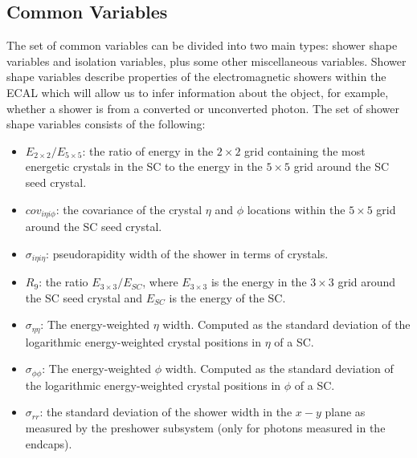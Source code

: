 \subsection{Common Variables}
The set of common variables can be divided into two main types: shower shape variables and isolation variables, plus some other miscellaneous variables. 
Shower shape variables describe properties of the electromagnetic showers within the ECAL which will allow us to infer information about the object, for example, whether a shower is from a converted or unconverted photon.
The set of shower shape variables consists of the following:
\begin{itemize}[noitemsep]
    \item $E_{2\times{}2}/E_{5\times{}5}$: the ratio of energy in the $2\times{}2$ grid containing the most energetic crystals in the SC to the energy in the $5\times{}5$ grid around the SC seed crystal.
    \item $cov_{i\eta{i}\phi}$: the covariance of the crystal $\eta$ and $\phi$ locations within the $5\times{}5$ grid around the SC seed crystal. 
    \item $\sigma_{i\eta{}i\eta}$: pseudorapidity width of the shower in terms of crystals. 
    \item $R_{9}$: the ratio $E_{3\times{}3}/E_{SC}$, where $E_{3\times{}3}$ is the energy in the $3\times{}3$ grid around the SC seed crystal and $E_{SC}$ is the energy of the SC.
    \item $\sigma_{\eta\eta}$: The energy-weighted $\eta$ width. Computed as the standard deviation of the logarithmic energy-weighted crystal positions in $\eta$ of a SC.
    \item $\sigma_{\phi\phi}$: The energy-weighted $\phi$ width. Computed as the standard deviation of the logarithmic energy-weighted crystal positions in $\phi$ of a SC.
    \item $\sigma_{rr}$: the standard deviation of the shower width in the $x-y$ plane as measured by the preshower subsystem (only for photons measured in the endcaps).
\end{itemize}


